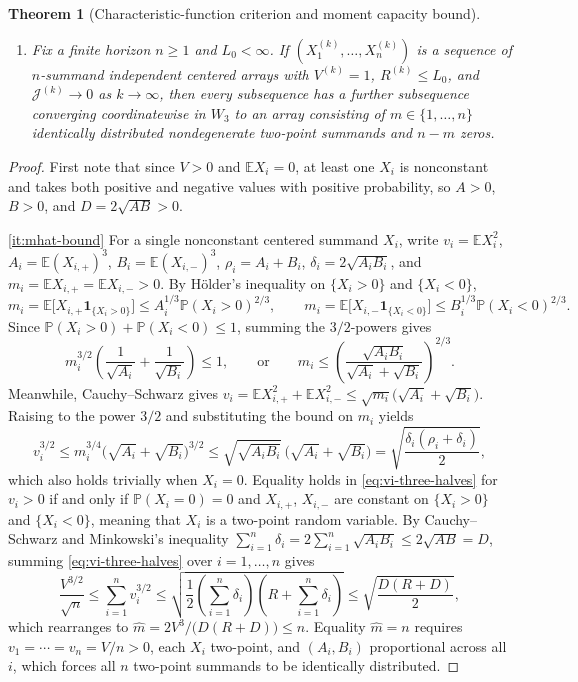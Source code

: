 \documentclass[11pt]{article}
\numberwithin{equation}{section}
\newtheorem{theorem}{Theorem}[section]
\theoremstyle{definition}
\theoremstyle{remark}
\newcommand{\E}{\mathbb E}
\newcommand{\Pp}{\mathbb P}
\newcommand{\ind}{\mathbf1}
\begin{document}
\begin{theorem}[Characteristic-function criterion and moment capacity bound]
\begin{enumerate}[label=(\roman*),leftmargin=2em]
\item\label{it:j-stability} Fix a finite horizon $n\ge1$ and $L_0<\infty$. If
$(X_1^{(k)},\ldots,X_n^{(k)})$ is a sequence of $n$-summand independent
centered arrays with $V^{(k)}=1$, $R^{(k)}\le L_0$, and
$\mathcal J^{(k)}\to0$ as $k\to\infty$, then every subsequence has a further
subsequence converging coordinatewise in $W_3$ to an array consisting of
$m\in\{1,\ldots,n\}$ identically distributed nondegenerate two-point summands
and $n-m$ zeros.
\end{enumerate}
\end{theorem}

\begin{proof}
First note that since $V>0$ and $\E X_i=0$, at least one $X_i$ is nonconstant
and takes both positive and negative values with positive probability, so
$A>0$, $B>0$, and $D=2\sqrt{AB}>0$.

\ref{it:mhat-bound} For a single nonconstant centered summand $X_i$, write
$v_i=\E X_i^2$, $A_i=\E(X_{i,+})^3$, $B_i=\E(X_{i,-})^3$,
$\rho_i=A_i+B_i$, $\delta_i=2\sqrt{A_iB_i}$, and $m_i=\E X_{i,+}=\E X_{i,-}>0$.
By H\"older's inequality on $\{X_i>0\}$ and $\{X_i<0\}$,
\[
 m_i=\E\bigl[X_{i,+}\ind_{\{X_i>0\}}\bigr]\le A_i^{1/3}\Pp(X_i>0)^{2/3},\qquad
 m_i=\E\bigl[X_{i,-}\ind_{\{X_i<0\}}\bigr]\le B_i^{1/3}\Pp(X_i<0)^{2/3}.
\]
Since $\Pp(X_i>0)+\Pp(X_i<0)\le1$, summing the $3/2$-powers gives
\[
 m_i^{3/2}\left(\frac{1}{\sqrt{A_i}}+\frac{1}{\sqrt{B_i}}\right)\le 1,
 \qquad\text{or}\qquad
 m_i\le\left(\frac{\sqrt{A_iB_i}}{\sqrt{A_i}+\sqrt{B_i}}\right)^{2/3}.
\]
Meanwhile, Cauchy--Schwarz gives
$v_i=\E X_{i,+}^2+\E X_{i,-}^2\le\sqrt{m_i}\bigl(\sqrt{A_i}+\sqrt{B_i}\bigr)$.
Raising to the power $3/2$ and substituting the bound on $m_i$ yields
\begin{equation}\label{eq:vi-three-halves}
 v_i^{3/2}\le m_i^{3/4}\bigl(\sqrt{A_i}+\sqrt{B_i}\bigr)^{3/2}
 \le\sqrt{\sqrt{A_iB_i}}\,\bigl(\sqrt{A_i}+\sqrt{B_i}\bigr)
 =\sqrt{\frac{\delta_i(\rho_i+\delta_i)}{2}},
\end{equation}
which also holds trivially when $X_i=0$. Equality holds in
\eqref{eq:vi-three-halves} for $v_i>0$ if and only if $\Pp(X_i=0)=0$ and
$X_{i,+}$, $X_{i,-}$ are constant on $\{X_i>0\}$ and $\{X_i<0\}$, meaning
that $X_i$ is a two-point random variable. By Cauchy--Schwarz and Minkowski's
inequality $\sum_{i=1}^n\delta_i=2\sum_{i=1}^n\sqrt{A_iB_i}\le 2\sqrt{AB}=D$,
summing \eqref{eq:vi-three-halves} over $i=1,\ldots,n$ gives
\[
 \frac{V^{3/2}}{\sqrt n}
 \le\sum_{i=1}^n v_i^{3/2}
 \le\sqrt{\frac12\left(\sum_{i=1}^n\delta_i\right)\left(R+\sum_{i=1}^n\delta_i\right)}
 \le\sqrt{\frac{D(R+D)}{2}},
\]
which rearranges to $\widehat m=2V^3/\bigl(D(R+D)\bigr)\le n$. Equality
$\widehat m=n$ requires $v_1=\cdots=v_n=V/n>0$, each $X_i$ two-point, and
$(A_i,B_i)$ proportional across all $i$, which forces all $n$ two-point
summands to be identically distributed.


\end{proof}
\end{document}
